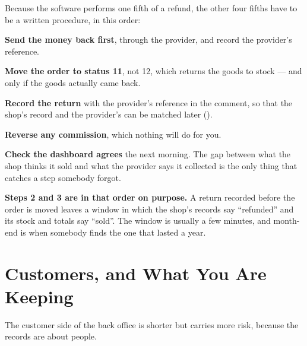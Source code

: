 \begin{conceptbox}
Because the software performs one fifth of a refund, the other four fifths have
to be a written procedure, in this order:

\begin{tightnum}
  \item \textbf{Send the money back first}, through the provider, and record
        the provider's reference.
  \item \textbf{Move the order to status 11}, not 12, which returns the goods
        to stock --- and only if the goods actually came back.
  \item \textbf{Record the return} with the provider's reference in the
        comment, so that the shop's record and the provider's can be matched
        later ().
  \item \textbf{Reverse any commission}, which nothing will do for you.
  \item \textbf{Check the dashboard agrees} the next morning. The gap between
        what the shop thinks it sold and what the provider says it collected is
        the only thing that catches a step somebody forgot.
\end{tightnum}

\smallskip
\textbf{Steps 2 and 3 are in that order on purpose.} A return recorded before
the order is moved leaves a window in which the shop's records say ``refunded''
and its stock and totals say ``sold''. The window is usually a few minutes, and
month-end is when somebody finds the one that lasted a year.
\end{conceptbox}

\section{Customers, and What You Are Keeping}

The customer side of the back office is shorter but carries more risk, because
the records are about people.

